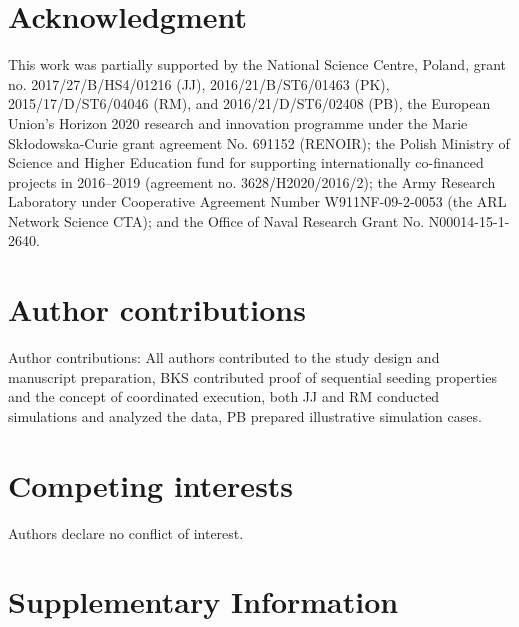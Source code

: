 \documentclass[11pt]{article} %
\begin{document}
\onecolumn
\section*{Acknowledgment}
This work was partially supported by the National Science Centre, Poland, grant no. 2017/27/B/HS4/01216 (JJ), 2016/21/B/ST6/01463 (PK), 2015/17/D/ST6/04046 (RM), and 2016/21/D/ST6/02408 (PB), the European Union's Horizon 2020 research and innovation programme under the Marie Sk\l{}odowska-Curie grant agreement No. 691152 (RENOIR); the Polish Ministry of Science and Higher Education fund for supporting internationally co-financed projects in 2016–2019 (agreement no. 3628/H2020/2016/2); the Army Research Laboratory under Cooperative Agreement Number W911NF-09-2-0053 (the ARL Network Science CTA); and the Office of Naval Research Grant No. N00014-15-1-2640. 

\section*{Author contributions}
Author contributions: All authors contributed to the study design and manuscript preparation, BKS contributed proof of sequential seeding properties and the concept of coordinated execution, both JJ and RM conducted simulations and analyzed the data, PB prepared illustrative simulation cases. 

\section*{Competing interests}
Authors declare no conflict of interest.

\section*{Supplementary Information}
\label{sec:supplement}
\end{document}
